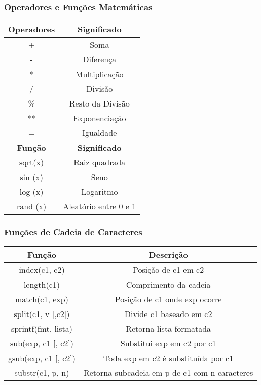 \documentclass{beamer}
\begin{document}
   \begin{frame}
      \frametitle{Operadores e Funções Matemáticas}

      \begin{table}
         \begin{tabular}{c|c}
         \textbf{Operadores} & \textbf{Significado} \\
	 \hline
         + & Soma \\
	 - & Diferença \\
	 * & Multiplicação \\
	 / & Divisão \\
	 \% & Resto da Divisão \\
	 ** & Exponenciação \\
	 = & Igualdade \\
	 \hline 
	 \textbf{Função} & \textbf{Significado} \\
	 \hline
          sqrt(x) & Raiz quadrada \\
	  sin (x) & Seno \\
	  log (x) & Logaritmo \\
	  rand (x) & Aleatório entre 0 e 1 \\
         \end{tabular}
      \end{table}
   \end{frame}


   \begin{frame}
      \frametitle{Funções de Cadeia de Caracteres}
      \begin{table}
         \begin{tabular}{c|c}
         \textbf{Função} & \textbf{Descrição} \\
         \hline
	 index(c1, c2) & Posição de c1 em c2 \\
	 length(c1) & Comprimento da cadeia \\ 
	 match(c1, exp) & Posição de c1 onde exp ocorre \\
	 split(c1, v [,c2]) & Divide c1 baseado em c2 \\
	 sprintf(fmt, lista) & Retorna lista formatada \\
	 sub(exp, c1 [, c2]) & Substitui exp em c2 por c1 \\
	 gsub(exp, c1 [, c2]) & Toda exp em c2 é substituída por c1 \\
	 substr(c1, p, n) & Retorna subcadeia em p de c1 com n caracteres \\
         \hline
         \end{tabular}
      \end{table}
   \end{frame}
\end{document}
